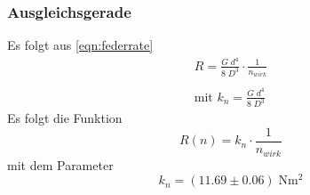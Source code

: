 \subsubsection{Ausgleichsgerade}

Es folgt aus \ref{eqn:federrate}
\begin{align*}
  R=\frac{G\;d^4}{8\;D^3}\cdot \frac{1}{n_{wirk}} \\\\  
  \text{mit } k_n=\frac{G\;d^4}{8\;D^3}
\end{align*}
Es folgt die Funktion
\begin{equation*}
  R(n)=k_n \cdot \frac{1}{n_{wirk}}
\end{equation*}
mit dem Parameter
\begin{equation*}
  k_n=(11.69 \pm 0.06) \;\si{\N\meter\squared}
\end{equation*}


